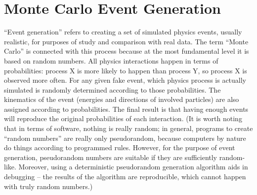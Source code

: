 \section{Monte Carlo Event Generation}
\label{sim:MC}

``Event generation'' refers to 
creating a set of 
simulated %
physics events, 
usually realistic, 
for purposes of study and 
comparison with real data.  
The term ``Monte Carlo'' is connected 
with this process 
because at the most fundamental level 
it is based on random numbers.  
All physics interactions happen in 
terms of probabilities: 
process X is more likely to happen than 
process Y, 
so process X is observed more often.  
For any given fake event, 
which physics process is actually simulated 
is randomly determined 
according to those probabilities.  
The kinematics of the event 
(energies and directions of 
involved particles) 
are also assigned according to 
probabilities.  
The final result is that having enough events 
will reproduce the original probabilities 
of each interaction.  
(It is worth noting that in terms of software, 
nothing is really random; in general, 
programs to create ``random numbers''
are really only pseudorandom, 
because computers by nature 
do things according to programmed rules.  
However, for the purpose of event generation, 
pseudorandom numbers are suitable if 
they are sufficiently random-like.  
Moreover, using a deterministic 
pseudorandom generation algorithm 
aids in debugging -- 
the results of the algorithm are reproducible, 
which cannot happen with truly random numbers.)  




